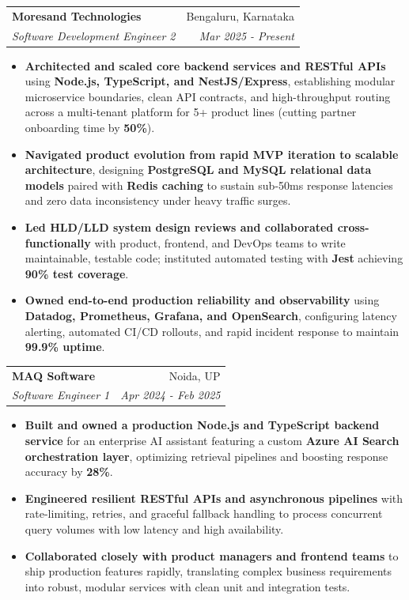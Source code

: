 \documentclass[a4paper,10pt]{article}
\makeatletter
\newcommand{\resumeSubheading}[4]{
  \vspace{-1pt}\item
    \begin{tabular*}{0.97\textwidth}{l@{\extracolsep{\fill}}r}
      \textbf{#1} & #2 \\
      \textit{#3} & \textit{#4} \\
    \end{tabular*}\vspace{-5pt}
}
\newcommand{\resumeItemListStart}{\begin{itemize}}
\newcommand{\resumeItemListEnd}{\end{itemize}\vspace{-5pt}}
\makeatother
\begin{document}
    \resumeSubheading{Moresand Technologies}{Bengaluru, Karnataka}
      {Software Development Engineer 2}{Mar 2025 - Present}
      \resumeItemListStart
        \item \textnormal{\textbf{Architected and scaled core backend services and RESTful APIs} using \textbf{Node.js, TypeScript, and NestJS/Express}, establishing modular microservice boundaries, clean API contracts, and high-throughput routing across a multi-tenant platform for 5+ product lines (cutting partner onboarding time by \textbf{50\%}).}
        \item \textnormal{\textbf{Navigated product evolution from rapid MVP iteration to scalable architecture}, designing \textbf{PostgreSQL and MySQL relational data models} paired with \textbf{Redis caching} to sustain sub-50ms response latencies and zero data inconsistency under heavy traffic surges.}
        \item \textnormal{\textbf{Led HLD/LLD system design reviews and collaborated cross-functionally} with product, frontend, and DevOps teams to write maintainable, testable code; instituted automated testing with \textbf{Jest} achieving \textbf{90\% test coverage}.}
        \item \textnormal{\textbf{Owned end-to-end production reliability and observability} using \textbf{Datadog, Prometheus, Grafana, and OpenSearch}, configuring latency alerting, automated CI/CD rollouts, and rapid incident response to maintain \textbf{99.9\% uptime}.}
      \resumeItemListEnd

    \resumeSubheading{MAQ Software}{Noida, UP}
      {Software Engineer 1}{Apr 2024 - Feb 2025}
      \resumeItemListStart
        \item \textnormal{\textbf{Built and owned a production Node.js and TypeScript backend service} for an enterprise AI assistant featuring a custom \textbf{Azure AI Search orchestration layer}, optimizing retrieval pipelines and boosting response accuracy by \textbf{28\%}.}
        \item \textnormal{\textbf{Engineered resilient RESTful APIs and asynchronous pipelines} with rate-limiting, retries, and graceful fallback handling to process concurrent query volumes with low latency and high availability.}
        \item \textnormal{\textbf{Collaborated closely with product managers and frontend teams} to ship production features rapidly, translating complex business requirements into robust, modular services with clean unit and integration tests.}
      \resumeItemListEnd
\end{document}
